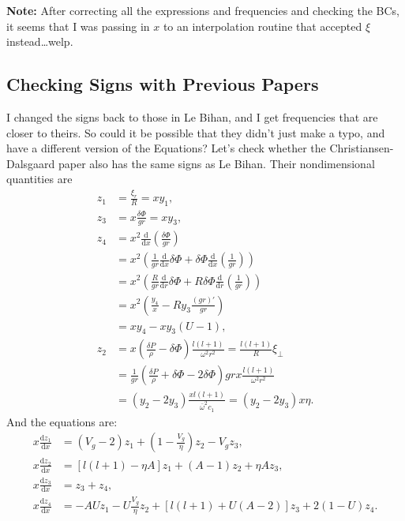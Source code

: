 \documentclass[11pt,
        usenames, %
        twocolumn,
        landscape,
        dvipsnames %
    ]{article}
\newcommand*{\rd}[2]{\frac{\mathrm{d}#1}{\mathrm{d}#2}}
\newcommand*{\p}[1]{\left(#1\right)}
\newcommand*{\s}[1]{\left[#1\right]}
\begin{document}
\textbf{Note:} After correcting all the expressions and frequencies and checking
the BCs, it seems that I was passing in $x$ to an interpolation routine that
accepted $\xi$ instead\dots welp.

\subsection{Checking Signs with Previous Papers}

I changed the signs back to those in Le Bihan, and I get frequencies that are
closer to theirs. So could it be possible that they didn't just make a typo, and
have a different version of the Equations? Let's check whether the
Christiansen-Dalsgaard paper also has the same signs as Le Bihan. Their
nondimensional quantities are
\begin{align}
    z_1 &= \frac{\xi_r}{R} = xy_1,\\
    z_3 &= x\frac{\delta \Phi}{gr} = xy_3,\\
    z_4 &= x^2\rd{}{x}\p{\frac{\delta \Phi}{gr}}\nonumber\\
        &= x^2\p{\frac{1}{gr}\rd{}{x}\delta \Phi
            + \delta \Phi \rd{}{x}\p{\frac{1}{gr}}}\nonumber\\
        &= x^2\p{\frac{R}{gr}\rd{}{r}\delta \Phi
            + R\delta \Phi \rd{}{r}\p{\frac{1}{gr}}}\nonumber\\
        &= x^2\p{\frac{y_4}{x}
            - Ry_3 \frac{(gr)'}{gr}}\nonumber\\
        &= xy_4 - xy_3 (U - 1),\\
    z_2 &= x\p{\frac{\delta P}{\rho} - \delta \Phi}\frac{l(l + 1)}{\omega^2r^2}
            = \frac{l(l+1)}{R}\xi_\perp\nonumber\\
        &= \frac{1}{gr}\p{\frac{\delta P}{\rho} + \delta \Phi - 2\delta \Phi}
            grx\frac{l(l + 1)}{\omega^2r^2}
            \nonumber\\
        &= \p{y_2 - 2y_3}\frac{xl(l+1)}{\bar{\omega}^2c_1}
        = \p{y_2 - 2y_3}x\eta.
\end{align}
And the equations are:
\begin{align}
    x\rd{z_1}{x} &= \p{V_g - 2} z_1 + \p{1 - \frac{V_g}{\eta}} z_2
        - V_gz_3,\\
    x\rd{z_2}{x} &= \s{l(l+1) - \eta A}z_1 + (A - 1)z_2 + \eta Az_3,\\
    x\rd{z_3}{x} &= z_3 + z_4,\\
    x\rd{z_4}{x} &= -AUz_1 - U\frac{V_g}{\eta}z_2
        + \s{l(l+1) + U(A - 2)}z_3
        + 2\p{1 - U}z_4.
\end{align}
\end{document}
